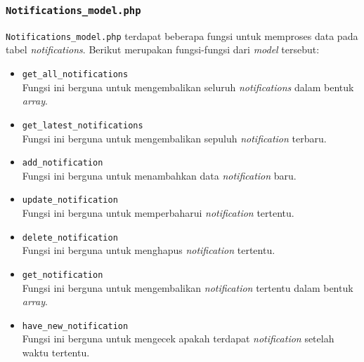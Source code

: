 \subsubsection{\texttt{Notifications\_model.php}}
\texttt{Notifications\_model.php} terdapat beberapa fungsi untuk memproses data pada tabel \textit{notifications}. Berikut merupakan fungsi-fungsi dari \textit{model} tersebut:
\begin{itemize}
	\item \texttt{get\_all\_notifications}\\
	Fungsi ini berguna untuk mengembalikan seluruh \textit{notifications} dalam bentuk \textit{array}.
	\item \texttt{get\_latest\_notifications}\\
	Fungsi ini berguna untuk mengembalikan sepuluh \textit{notification} terbaru.
	\item \texttt{add\_notification}\\
	Fungsi ini berguna untuk menambahkan data \textit{notification} baru.
	\item \texttt{update\_notification}\\
	Fungsi ini berguna untuk memperbaharui \textit{notification} tertentu.
	\item \texttt{delete\_notification}\\
	Fungsi ini berguna untuk menghapus \textit{notification} tertentu.
	\item \texttt{get\_notification}\\
	Fungsi ini berguna untuk mengembalikan \textit{notification} tertentu dalam bentuk \textit{array}.
	\item \texttt{have\_new\_notification}\\
	Fungsi ini berguna untuk mengecek apakah terdapat \textit{notification} setelah waktu tertentu.
\end{itemize}
